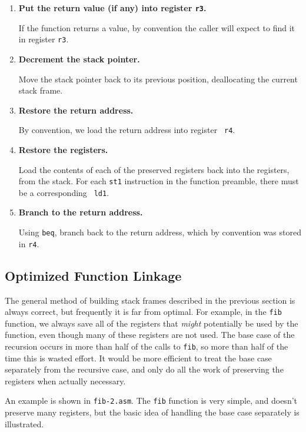 \documentclass[makeidx,psfig]{article}
\begin{document}
\begin{enumerate}

\item	{\bf Put the return value (if any) into register {\tt r3}.}

	If the function returns a value, by convention the caller will
	expect to find it in register {\tt r3}.

\item	{\bf Decrement the stack pointer.}

	Move the stack pointer back to its previous position,
	deallocating the current stack frame.

\item	{\bf Restore the return address.}

	By convention, we load the return address into register {\tt
	r4}.

\item	{\bf Restore the registers.}

	Load the contents of each of the preserved registers back into
	the registers, from the stack.  For each {\tt st1} instruction
	in the function preamble, there must be a corresponding {\tt
	ld1}.

\item	{\bf Branch to the return address.}

	Using {\tt beq}, branch back to the return address, which
	by convention was stored in {\tt r4}.

\end{enumerate}

\subsection{Optimized Function Linkage}

The general method of building stack frames described in the previous
section is always correct, but frequently it is far from optimal.  For
example, in the {\tt fib} function, we always save all of the
registers that {\em might} potentially be used by the function, even
though many of these registers are not used.  The base case of the
recursion occurs in more than half of the calls to {\tt fib}, so more
than half of the time this is wasted effort.  It would be more
efficient to treat the base case separately from the recursive case,
and only do all the work of preserving the registers when actually
necessary.

An example is shown in {\tt fib-2.asm}.  The {\tt fib} function is
very simple, and doesn't preserve many registers, but the basic idea
of handling the base case separately is illustrated.

% 
\end{document}

